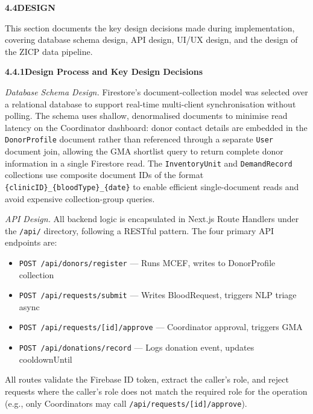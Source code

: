 \documentclass[12pt,a4paper]{article}
\begin{document}
\vspace{2em}
\noindent\textbf{4.4\quad DESIGN}
\vspace{0.8em}

\noindent This section documents the key design decisions made during implementation, covering database schema design, API design, UI/UX design, and the design of the ZICP data pipeline.

\vspace{1.2em}
\noindent\textbf{4.4.1\quad Design Process and Key Design Decisions}
\vspace{0.5em}

\noindent\textit{Database Schema Design.} Firestore's document-collection model was selected over a relational database to support real-time multi-client synchronisation without polling. The schema uses shallow, denormalised documents to minimise read latency on the Coordinator dashboard: donor contact details are embedded in the \texttt{DonorProfile} document rather than referenced through a separate \texttt{User} document join, allowing the GMA shortlist query to return complete donor information in a single Firestore read. The \texttt{InventoryUnit} and \texttt{DemandRecord} collections use composite document IDs of the format \texttt{\{clinicID\}\_\{bloodType\}\_\{date\}} to enable efficient single-document reads and avoid expensive collection-group queries.

\noindent\textit{API Design.} All backend logic is encapsulated in Next.js Route Handlers under the \texttt{/api/} directory, following a RESTful pattern. The four primary API endpoints are:

\begin{itemize}[leftmargin=1.5em, itemsep=0.3em]
    \item \texttt{POST /api/donors/register} — Runs MCEF, writes to DonorProfile collection
    \item \texttt{POST /api/requests/submit} — Writes BloodRequest, triggers NLP triage async
    \item \texttt{POST /api/requests/[id]/approve} — Coordinator approval, triggers GMA
    \item \texttt{POST /api/donations/record} — Logs donation event, updates cooldownUntil
\end{itemize}

\noindent All routes validate the Firebase ID token, extract the caller's role, and reject requests where the caller's role does not match the required role for the operation (e.g., only Coordinators may call \texttt{/api/requests/[id]/approve}).
\end{document}
